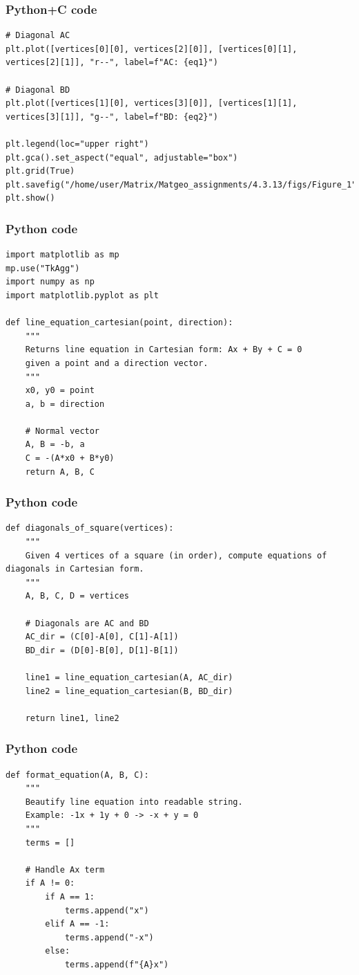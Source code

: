 \documentclass{beamer}
\begin{document}
\begin{frame}[fragile]
    \frametitle{Python+C code}

    \begin{lstlisting}
# Diagonal AC
plt.plot([vertices[0][0], vertices[2][0]], [vertices[0][1], vertices[2][1]], "r--", label=f"AC: {eq1}")

# Diagonal BD
plt.plot([vertices[1][0], vertices[3][0]], [vertices[1][1], vertices[3][1]], "g--", label=f"BD: {eq2}")

plt.legend(loc="upper right")
plt.gca().set_aspect("equal", adjustable="box")
plt.grid(True)
plt.savefig("/home/user/Matrix/Matgeo_assignments/4.3.13/figs/Figure_1")
plt.show()
    \end{lstlisting}
\end{frame}

\begin{frame}[fragile]
    \frametitle{Python code}

    \begin{lstlisting}
import matplotlib as mp
mp.use("TkAgg")
import numpy as np
import matplotlib.pyplot as plt

def line_equation_cartesian(point, direction):
    """
    Returns line equation in Cartesian form: Ax + By + C = 0
    given a point and a direction vector.
    """
    x0, y0 = point
    a, b = direction
    
    # Normal vector
    A, B = -b, a
    C = -(A*x0 + B*y0)
    return A, B, C
    \end{lstlisting}
\end{frame}

\begin{frame}[fragile]
    \frametitle{Python code}

    \begin{lstlisting}
def diagonals_of_square(vertices):
    """
    Given 4 vertices of a square (in order), compute equations of diagonals in Cartesian form.
    """
    A, B, C, D = vertices
    
    # Diagonals are AC and BD
    AC_dir = (C[0]-A[0], C[1]-A[1])
    BD_dir = (D[0]-B[0], D[1]-B[1])
    
    line1 = line_equation_cartesian(A, AC_dir)
    line2 = line_equation_cartesian(B, BD_dir)
    
    return line1, line2
    \end{lstlisting}
\end{frame}


\begin{frame}[fragile]
    \frametitle{Python code}

    \begin{lstlisting}
def format_equation(A, B, C):
    """
    Beautify line equation into readable string.
    Example: -1x + 1y + 0 -> -x + y = 0
    """
    terms = []

    # Handle Ax term
    if A != 0:
        if A == 1:
            terms.append("x")
        elif A == -1:
            terms.append("-x")
        else:
            terms.append(f"{A}x")

    \end{lstlisting}
\end{frame}
\end{document}
